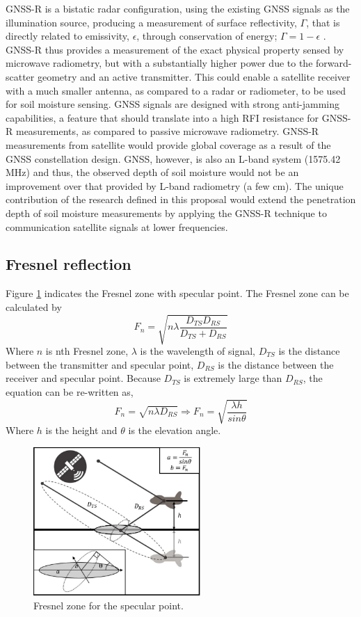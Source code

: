 \documentclass[draftcls]{IEEEtran}
\begin{document}
GNSS-R is a bistatic radar configuration, using the existing GNSS signals as the illumination source, producing a measurement of surface reflectivity, $\Gamma$, that is directly related to emissivity, $\epsilon$, through conservation of energy; $ \Gamma = 1 - \epsilon $ \cite{Jin:2011}. GNSS-R thus provides a measurement of the exact physical property sensed by microwave radiometry, but with a substantially higher power due to the forward-scatter geometry and an active transmitter. This could enable a satellite receiver with a much smaller antenna, as compared to a radar or radiometer, to be used for soil moisture sensing. GNSS signals are designed with strong anti-jamming capabilities, a feature that should translate into a high RFI resistance for GNSS-R measurements, as compared to passive microwave radiometry. GNSS-R measurements from satellite would provide global coverage as a result of the GNSS constellation design. GNSS, however, is also an L-band system (1575.42 MHz) and thus, the observed depth of soil moisture would not be an improvement over that provided by L-band
radiometry (a few cm). The unique contribution of the research defined in this proposal would extend the penetration depth of soil moisture measurements by applying the GNSS-R technique to communication satellite signals at lower frequencies.

\subsection{Fresnel reflection}
Figure \ref{fig:Fresnel zone} indicates the Fresnel zone with specular point. The Fresnel zone can be calculated by
\begin{equation}
	F_n=\sqrt{n \lambda \frac{D_{TS}D_{RS}}{D_{TS}+D_{RS}}} \label{Eq: Fresnel_zone}
\end{equation}
Where $n$ is nth Fresnel zone, $\lambda$ is the wavelength of signal, $D_{TS}$ is the distance between the transmitter and specular point, $D_{RS}$ is the distance between the receiver and specular point. Because $D_{TS}$ is extremely large than $D_{RS}$, the equation can be re-written as,
\begin{equation}
	F_n=\sqrt{n \lambda D_{RS}} \Rightarrow F_n=\sqrt{\frac{\lambda h}{sin\theta} } \label{Eq: Fresnel_zone_reduce}
\end{equation}
Where $h$ is the height and $\theta$ is the elevation angle.
\begin{figure}[!t]
	\centering
	\includegraphics[width=2.5in]{pdf/Fresnel_zone.pdf}
	\caption{Fresnel zone for the specular point.}
    \centering
	\label{fig:Fresnel zone}
\end{figure}
\end{document}
